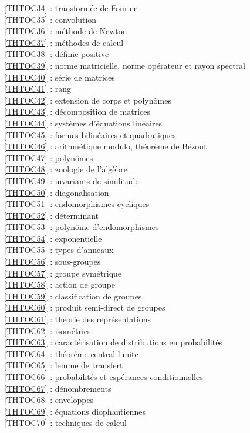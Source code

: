 \ref {THTOC34} : transformée de Fourier\\
\ref {THTOC35} : convolution\\
\ref {THTOC36} : méthode de Newton\\
\ref {THTOC37} : méthodes de calcul\\
\ref {THTOC38} : définie positive\\
\ref {THTOC39} : norme matricielle, norme opérateur et rayon spectral\\
\ref {THTOC40} : série de matrices\\
\ref {THTOC41} : rang\\
\ref {THTOC42} : extension de corps et polynômes\\
\ref {THTOC43} : décomposition de matrices\\
\ref {THTOC44} : systèmes d'équations linéaires\\
\ref {THTOC45} : formes bilinéaires et quadratiques\\
\ref {THTOC46} : arithmétique modulo, théorème de Bézout\\
\ref {THTOC47} : polynômes\\
\ref {THTOC48} : zoologie de l'algèbre\\
\ref {THTOC49} : invariants de similitude\\
\ref {THTOC50} : diagonalisation\\
\ref {THTOC51} : endomorphismes cycliques\\
\ref {THTOC52} : déterminant\\
\ref {THTOC53} : polynôme d'endomorphismes\\
\ref {THTOC54} : exponentielle\\
\ref {THTOC55} : types d'anneaux\\
\ref {THTOC56} : sous-groupes\\
\ref {THTOC57} : groupe symétrique\\
\ref {THTOC58} : action de groupe\\
\ref {THTOC59} : classification de groupes\\
\ref {THTOC60} : produit semi-direct de groupes\\
\ref {THTOC61} : théorie des représentations\\
\ref {THTOC62} : isométries\\
\ref {THTOC63} : caractérisation de distributions en probabilités\\
\ref {THTOC64} : théorème central limite\\
\ref {THTOC65} : lemme de transfert\\
\ref {THTOC66} : probabilités et espérances conditionnelles\\
\ref {THTOC67} : dénombrements\\
\ref {THTOC68} : enveloppes\\
\ref {THTOC69} : équations diophantiennes\\
\ref {THTOC70} : techniques de calcul\\
